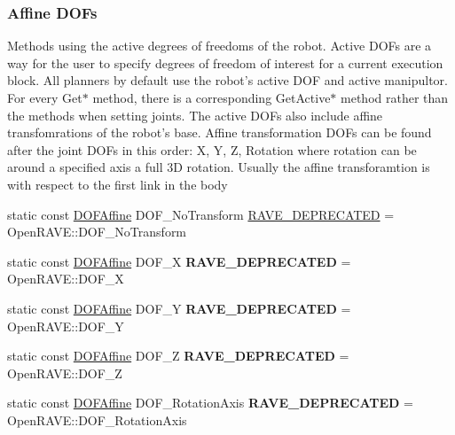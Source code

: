 \subsubsection*{Affine DOFs}
\label{_amgrp62be18eed7c72d5f553733a12f3e3602}
 Methods using the active degrees of freedoms of the robot. Active DOFs are a way for the user to specify degrees of freedom of interest for a current execution block. All planners by default use the robot's active DOF and active manipultor. For every Get$\ast$ method, there is a corresponding GetActive$\ast$ method rather than the methods when setting joints. The active DOFs also include affine transfomrations of the robot's base. Affine transformation DOFs can be found after the joint DOFs in this order: X, Y, Z, Rotation where rotation can be around a specified axis a full 3D rotation. Usually the affine transforamtion is with respect to the first link in the body \begin{DoxyCompactItemize}
\item 
static const \hyperlink{namespaceOpenRAVE_a3016e2185103f3c1bdc5e4482893ca98}{DOFAffine} DOF\_\-NoTransform \hyperlink{classOpenRAVE_1_1RobotBase_ad7131b2e388f7f953e9cc14f7336c8e2}{RAVE\_\-DEPRECATED} = OpenRAVE::DOF\_\-NoTransform
\item 
\hypertarget{classOpenRAVE_1_1RobotBase_a17eb2c02db0e448f7305cbb2cd174525}{
static const \hyperlink{namespaceOpenRAVE_a3016e2185103f3c1bdc5e4482893ca98}{DOFAffine} DOF\_\-X {\bfseries RAVE\_\-DEPRECATED} = OpenRAVE::DOF\_\-X}
\label{classOpenRAVE_1_1RobotBase_a17eb2c02db0e448f7305cbb2cd174525}

\item 
\hypertarget{classOpenRAVE_1_1RobotBase_a064c19af74ffccc473774e53497df767}{
static const \hyperlink{namespaceOpenRAVE_a3016e2185103f3c1bdc5e4482893ca98}{DOFAffine} DOF\_\-Y {\bfseries RAVE\_\-DEPRECATED} = OpenRAVE::DOF\_\-Y}
\label{classOpenRAVE_1_1RobotBase_a064c19af74ffccc473774e53497df767}

\item 
\hypertarget{classOpenRAVE_1_1RobotBase_af920cbd372e9736b45b8582a0f4a3e6a}{
static const \hyperlink{namespaceOpenRAVE_a3016e2185103f3c1bdc5e4482893ca98}{DOFAffine} DOF\_\-Z {\bfseries RAVE\_\-DEPRECATED} = OpenRAVE::DOF\_\-Z}
\label{classOpenRAVE_1_1RobotBase_af920cbd372e9736b45b8582a0f4a3e6a}

\item 
\hypertarget{classOpenRAVE_1_1RobotBase_a2d3278e7bbdd94bad80e4fdbb3b41f3c}{
static const \hyperlink{namespaceOpenRAVE_a3016e2185103f3c1bdc5e4482893ca98}{DOFAffine} DOF\_\-RotationAxis {\bfseries RAVE\_\-DEPRECATED} = OpenRAVE::DOF\_\-RotationAxis}
\label{classOpenRAVE_1_1RobotBase_a2d3278e7bbdd94bad80e4fdbb3b41f3c}


\end{DoxyCompactItemize}
